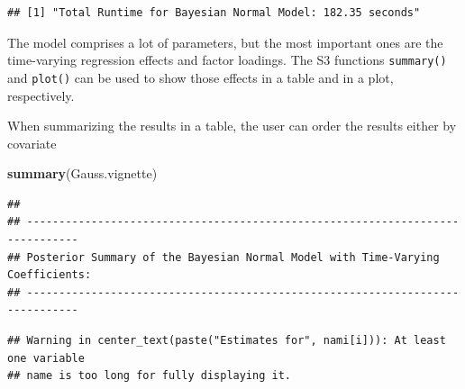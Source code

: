 \documentclass[a4paper, preprint, 3p,
authoryear]{elsarticle} %
\newenvironment{Shaded}{\begin{snugshade}}{\end{snugshade}}
\newcommand{\FunctionTok}[1]{\textcolor[rgb]{0.13,0.29,0.53}{\textbf{#1}}}
\newcommand{\NormalTok}[1]{#1}
\begin{document}
\begin{verbatim}
## [1] "Total Runtime for Bayesian Normal Model: 182.35 seconds"
\end{verbatim}

The model comprises a lot of parameters, but the most important ones are
the time-varying regression effects and factor loadings. The S3
functions \texttt{summary()} and \texttt{plot()} can be used to show
those effects in a table and in a plot, respectively.

When summarizing the results in a table, the user can order the results
either by covariate

\begin{Shaded}
\begin{Highlighting}[]
\FunctionTok{summary}\NormalTok{(Gauss.vignette)}
\end{Highlighting}
\end{Shaded}

\begin{verbatim}
## 
## ------------------------------------------------------------------------------
## Posterior Summary of the Bayesian Normal Model with Time-Varying Coefficients:
## ------------------------------------------------------------------------------
\end{verbatim}

\begin{verbatim}
## Warning in center_text(paste("Estimates for", nami[i])): At least one variable
## name is too long for fully displaying it.
\end{verbatim}
\end{document}
